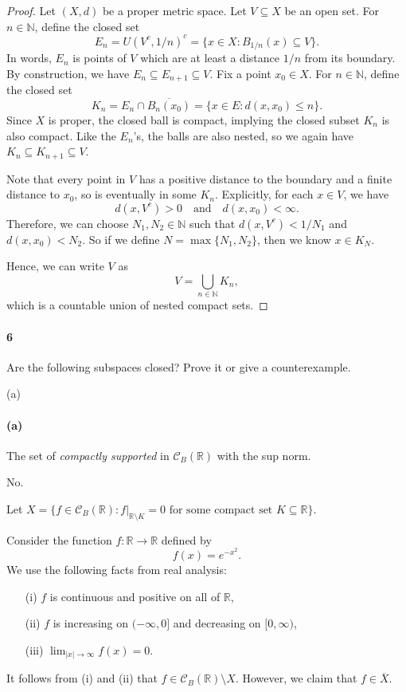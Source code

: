\documentclass[12pt]{article}
\newlength{\myparskip}
\newenvironment{fullbox}{\begin{lrbox}{\savefullbox}\begin{minipage}{\dimexpr\textwidth-2\fboxsep\relax}\setlength{\parskip}{\myparskip}}{\end{minipage}\end{lrbox}\framebox[\textwidth]{\usebox{\savefullbox}}}
\newenvironment{pbox}[1][]{\begin{fullbox}\ifx#1\empty\else\paragraph{#1}\fi}{\end{fullbox}}
\theoremstyle{definition}
\newcommand{\isp}[1]{\quad\text{#1}\quad}
\newcommand{\N}{\mathbb{N}}
\newcommand{\R}{\mathbb{R}}
\newcommand{\<}{\langle}
\renewcommand{\>}{\rangle}
\newcommand{\clo}{\overline}
\newcommand{\CC}{\mathcal{C}}
\begin{document}
\begin{proof}
    Let $(X, d)$ be a proper metric space. Let $V \subseteq X$ be an open set. For $n \in \N$, define the closed set
    \[
        E_n = U(V^c, 1/n)^c = \{x \in X : B_{1/n}(x) \subseteq V\}.
    \]
    In words, $E_n$ is points of $V$ which are at least a distance $1/n$ from its boundary. By construction, we have $E_n \subseteq E_{n+1} \subseteq V$. Fix a point $x_0 \in X$. For $n \in \N$, define the closed set
    \[
        K_n = E_n \cap \clo{B_n(x_0)} = \{x \in E : d(x, x_0) \leq n\}.
    \]
    Since $X$ is proper, the closed ball is compact, implying the closed subset $K_n$ is also compact. Like the $E_n$'s, the balls are also nested, so we again have $K_n \subseteq K_{n+1} \subseteq V$.
    
    Note that every point in $V$ has a positive distance to the boundary and a finite distance to $x_0$, so is eventually in some $K_n$. Explicitly, for each $x \in V$, we have
    \[
        d(x, V^c) > 0 \isp{and} d(x, x_0) < \infty.
    \]
    Therefore, we can choose $N_1, N_2 \in \N$ such that $d(x, V^c) < 1/N_1$ and $d(x, x_0) < N_2$. So if we define $N = \max\{N_1, N_2\}$, then we know $x \in K_N$.
    
    Hence, we can write $V$ as
    \[
        V = \bigcup_{n \in \N} K_n,
    \]
    which is a countable union of nested compact sets.

\end{proof}


\newpage
\begin{pbox}[6]
    Are the following subspaces closed? Prove it or give a counterexample.
\end{pbox}

\begin{pbox}[(a)]
    The set of \textit{compactly supported} in $\CC_B(\R)$ with the sup norm.
\end{pbox}

No.

Let $X = \{f \in \CC_B(\R) : f|_{\R \setminus K} = 0 \text{ for some compact set } K \subseteq \R\}$.

Consider the function $f : \R \to \R$ defined by
\[
    f(x) = e^{-x^2}.
\]
We use the following facts from real analysis:
\begin{itemize}
    \item[(i)] $f$ is continuous and positive on all of $\R$,
    \item[(ii)] $f$ is increasing on $(-\infty, 0]$ and decreasing on $[0, \infty)$,
    \item[(iii)] $\lim_{|x| \to \infty} f(x) = 0$.
\end{itemize}
It follows from (i) and (ii) that $f \in \CC_B(\R) \setminus X$. However, we claim that $f \in \clo{X}$.
\end{document}
